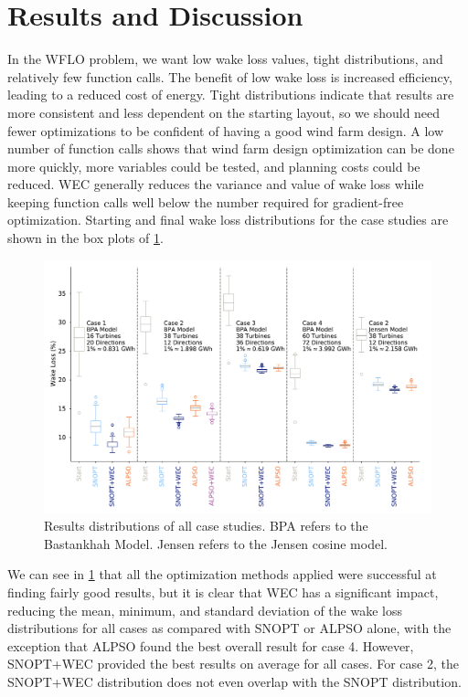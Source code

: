 \documentclass{jpconf}
\begin{document}
\section{Results and Discussion}\label{sec:results}

In the WFLO problem, we  want low wake loss values, tight distributions, and relatively few function calls. The benefit of low wake loss is increased efficiency, leading to a reduced cost of energy. Tight distributions indicate that results are more consistent and less dependent on the starting layout, so we should need fewer optimizations to be confident of having a good wind farm design. A low number of function calls shows that wind farm design optimization can be done more quickly, more variables could be tested, and planning costs could be reduced. WEC generally reduces the variance and value of wake loss while keeping function calls well below the number required for gradient-free optimization. Starting and final wake loss distributions for the case studies are shown in the box plots of \cref{fig:boxplots}. 
%
\begin{figure}[h!]
	\centering
	\begin{minipage}[t]{\textwidth}
		\centering
		\includegraphics[width=\textwidth]{final_images/results/dist_boxpercentwakeloss.pdf}  
		\caption{Results distributions of all case studies. BPA refers to the Bastankhah Model. Jensen refers to the Jensen cosine model.}
		\label{fig:boxplots}
	\end{minipage} 
\end{figure}

We can see in \cref{fig:boxplots} that all the optimization methods applied were successful at finding fairly good results, but it is clear that WEC has a significant impact, reducing the mean, minimum, and standard deviation of the wake loss distributions for all cases as compared with SNOPT or ALPSO alone, with the exception that ALPSO found the best overall result for case 4. However, SNOPT+WEC  provided the best results on average for all cases. For case 2, the SNOPT+WEC distribution does not even overlap with the SNOPT distribution. 
\end{document}
